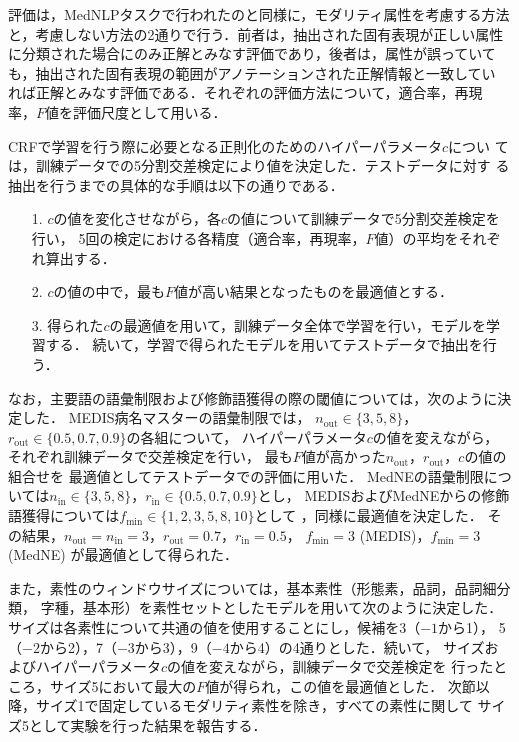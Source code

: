 \documentclass[japanese]{jnlp_1.4}
\begin{document}
評価は，MedNLPタスクで行われたのと同様に，モダリティ属性を考慮する方法
と，考慮しない方法の2通りで行う．前者は，抽出された固有表現が正しい属性
に分類された場合にのみ正解とみなす評価であり，後者は，属性が誤っていて
も，抽出された固有表現の範囲がアノテーションされた正解情報と一致してい
れば正解とみなす評価である．それぞれの評価方法について，適合率，再現
率，$F$値を評価尺度として用いる．

CRFで学習を行う際に必要となる正則化のためのハイパーパラメータ$c$につい
ては，訓練データでの5分割交差検定により値を決定した．テストデータに対す
る抽出を行うまでの具体的な手順は以下の通りである．
\begin{itemize}
\item[1.] $c$の値を変化させながら，各$c$の値について訓練データで5分割交差検定を行い，
 5回の検定における各精度（適合率，再現率，$F$値）の平均をそれぞれ算出する．
\item[2.] $c$の値の中で，最も$F$値が高い結果となったものを最適値とする．
\item[3.] 得られた$c$の最適値を用いて，訓練データ全体で学習を行い，モデルを学習する．
続いて，学習で得られたモデルを用いてテストデータで抽出を行う．
\end{itemize}
なお，主要語の語彙制限および修飾語獲得の際の閾値については，次のように決定した．
MEDIS病名マスターの語彙制限では，
$n_\mathrm{out}\in\{3,5,8\}$，$r_\mathrm{out}\in\{0.5,0.7,0.9\}$の各組について，
ハイパーパラメータ$c$の値を変えながら，それぞれ訓練データで交差検定を行い，
最も$F$値が高かった$n_\mathrm{out}$，$r_\mathrm{out}$，$c$の値の組合せを
最適値としてテストデータでの評価に用いた．
MedNEの語彙制限については$n_\mathrm{in}\in\{3,5,8\}$，$r_\mathrm{in}\in\{0.5,0.7,0.9\}$とし，
MEDISおよびMedNEからの修飾語獲得については$f_\mathrm{min}\in\{1,2,3,5,8,10\}$として
，同様に最適値を決定した．
その結果，$n_\mathrm{out}=n_\mathrm{in}=3$，$r_\mathrm{out}=0.7$，$r_\mathrm{in}=0.5$，
$f_\mathrm{min}=3$ (MEDIS)，$f_\mathrm{min}=3$ (MedNE) が最適値として得られた．

また，素性のウィンドウサイズについては，基本素性（形態素，品詞，品詞細分類，
字種，基本形）を素性セットとしたモデルを用いて次のように決定した．
サイズは各素性について共通の値を使用することにし，候補を3（$-1$から1），
5（$-2$から2），7（$-3$から3），9（$-4$から4）の4通りとした．続いて，
サイズおよびハイパーパラメータ$c$の値を変えながら，訓練データで交差検定を
行ったところ，サイズ5において最大の$F$値が得られ，この値を最適値とした．
次節以降，サイズ1で固定しているモダリティ素性を除き，すべての素性に関して
サイズ5として実験を行った結果を報告する．
\end{document}
